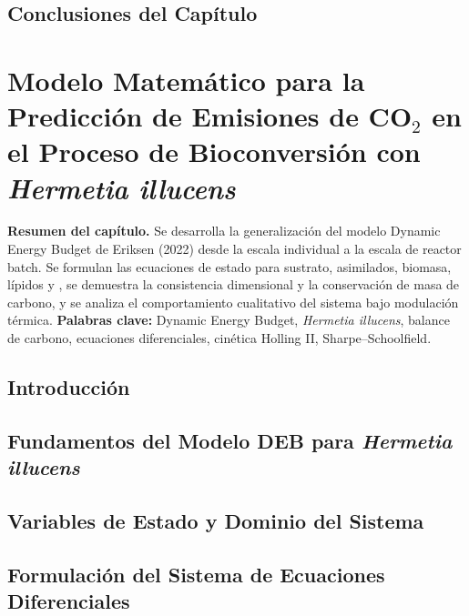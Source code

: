 \documentclass[10pt,spanish,fleqn,openany,twoside,letterpaper]{book}
\begin{document}
\section{Conclusiones del Capítulo}
\label{sec:cap2_conclusiones}


\chapter{Modelo Matemático para la Predicción de Emisiones de CO\texorpdfstring{$_2$}{2} en el Proceso de Bioconversión con \textit{Hermetia illucens}}
\label{chap:modelo}
\begin{center}
\small
\textbf{Resumen del capítulo.}
Se desarrolla la generalización del modelo Dynamic Energy Budget de Eriksen (2022) desde la escala individual a la escala de reactor batch. Se formulan las ecuaciones de estado para sustrato, asimilados, biomasa, lípidos y , se demuestra la consistencia dimensional y la conservación de masa de carbono, y se analiza el comportamiento cualitativo del sistema bajo modulación térmica.
\textbf{Palabras clave:} Dynamic Energy Budget, \textit{Hermetia illucens}, balance de carbono, ecuaciones diferenciales, cinética Holling II, Sharpe--Schoolfield.
\end{center}

\section{Introducción}
\label{sec:cap3_intro}


\section{Fundamentos del Modelo DEB para \textit{Hermetia illucens}}
\label{sec:cap3_fundamentos_deb}


\section{Variables de Estado y Dominio del Sistema}
\label{sec:cap3_variables}


\section{Formulación del Sistema de Ecuaciones Diferenciales}
\label{sec:cap3_formulacion_ode}

\end{document}
